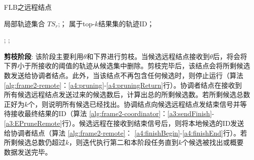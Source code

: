     \begin{algorithm}[t]
    	\caption{FLB之远程结点}
    	\label{alg:frame2-remote}
    	\begin{algorithmic}[1]
    		\REQUIRE 局部轨迹集合 $TS_{r}$;；
    		\ENSURE 属于top-$k$结果集的轨迹ID；
    		
    		 \label{a4:update}
    		\label{a4:pruning}
    		 
    		\RETURN;\label{a4:pruningReturn}
    		\ENDIF
    		 \label{a4:finishBegin} 
    		\ELSE \label{a4:ForceExitBegin}
    		\RETURN;\label{a4:ForceExitEnd}
    		\ENDIF
    		\ENDWHILE
    	\end{algorithmic}
    \end{algorithm}
    
\textbf{剪枝阶段}: 该阶段主要利用$\theta$和下界进行剪枝。当候选远程结点接收到$\theta$后，将会将下界小于所接收的阈值的轨迹从候选集中删除。剪枝完毕后，该结点会将所剩候选数发送给协调者结点。此外，当该结点不再包含任何候选时，则停止运行（算法 \ref{alg:frame2-remote}：\ref{a4:pruning}-\ref{a4:pruningReturn}行）。协调者结点在接收到
所有候选远程结点发送过来的候选数后，计算出总的所剩候选数。若所剩候选总数正好为$k$个，则说明所有候选已经找出。协调结点向候选远程结点发结束信号并等待接收最终结果的ID（算法 \ref{alg:frame2-coordinator}：\ref{a3:sendFinish}-\ref{a3:EPruneRemote}行）。候选远程在接收到结束信号后，则将本地候选的ID发送给协调者结点（算法 \ref{alg:frame2-remote}： \ref{a4:finishBegin}-\ref{a4:finishEnd}行）。若所剩候选总数仍超过$k$，则迭代执行第二和本阶段任务直到$k$个候选被找出或概要数据发送完毕。


